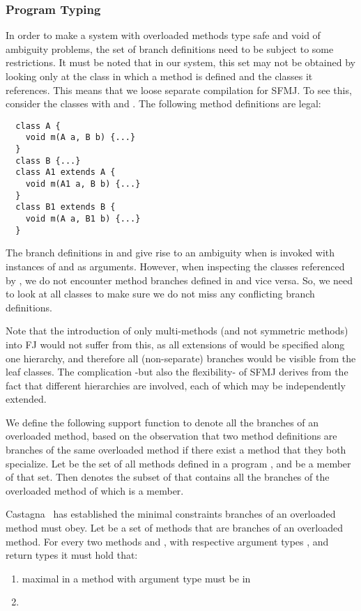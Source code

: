 \documentclass[11pt]{article}
\begin{document}
\subsubsection{Program Typing}

In order to make a system with overloaded methods type safe and void of ambiguity problems, the set of branch definitions need to be subject to some restrictions. It must be noted that in our system, this set may not be obtained by looking only at the class in which a method is defined and the classes it references. This means that we loose separate compilation for SFMJ. To see this, consider the classes  with  and . The following method definitions are legal:
\begin{verbatim}
  class A {
    void m(A a, B b) {...}
  }
  class B {...}
  class A1 extends A {
    void m(A1 a, B b) {...}
  }
  class B1 extends B {
    void m(A a, B1 b) {...}
  }
\end{verbatim}
The branch definitions in  and  give rise to an ambiguity when  is invoked with instances of  and  as arguments. However, when inspecting the classes referenced by , we do not encounter method branches defined in  and vice versa. So, we need to look at all classes to make sure we do not miss any conflicting branch definitions. 

Note that the introduction of only multi-methods (and not symmetric methods) into FJ would not suffer from this, as all extensions of  would be specified along one hierarchy, and therefore all (non-separate) branches would be visible from the leaf classes. The complication -but also the flexibility- of SFMJ derives from the fact that different hierarchies are involved, each of which may be independently extended.

We define the following support function to denote all the branches of an overloaded method, based on the observation that two method definitions are branches of the same overloaded method if there exist a method that they both specialize. Let  be the set of all methods defined in a program , and  be a member of that set. Then  denotes the subset of  that contains all the branches of the overloaded method of which  is a member.


Castagna~\cite{castagna95calculus} has established the minimal constraints branches of an overloaded method must obey. Let  be a set of methods that are branches of an overloaded method. For every two methods  and , with respective argument types , and return types  it must hold that: 
\begin{enumerate}
	\item  maximal in  a method  with argument type  must be in 
	\item  
\end{enumerate}
\end{document}
